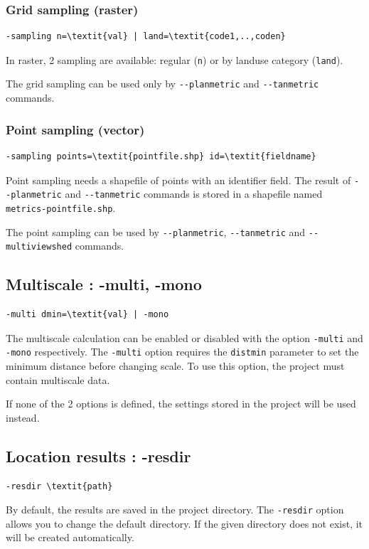 \documentclass{report}
\begin{document}
\subsubsection{Grid sampling (raster)}
\begin{Verbatim}[commandchars=\\\{\}]
-sampling n=\textit{val} | land=\textit{code1,..,coden}
\end{Verbatim}
In raster, 2 sampling are available: regular (\verb|n|) or by landuse category (\verb|land|).

The grid sampling can be used only by \verb|--planmetric| and \verb|--tanmetric| commands.

\subsubsection{Point sampling (vector)}
\begin{Verbatim}[commandchars=\\\{\}]
-sampling points=\textit{pointfile.shp} id=\textit{fieldname}
\end{Verbatim}
Point sampling needs a shapefile of points with an identifier field.
The result of \verb|--planmetric| and \verb|--tanmetric| commands is stored in a shapefile named \verb|metrics-pointfile.shp|.

The point sampling can be used by \verb|--planmetric|, \verb|--tanmetric| and \verb|--multiviewshed| commands.

\subsection{Multiscale : -multi, -mono}
\begin{Verbatim}[commandchars=\\\{\}]
-multi dmin=\textit{val} | -mono
\end{Verbatim}

The multiscale calculation can be enabled or disabled with the option \verb|-multi| and \verb|-mono| respectively.
The \verb|-multi| option requires the \verb|distmin| parameter to set the minimum distance before changing scale. To use this option, the project must contain multiscale data.

If none of the 2 options is defined, the settings stored in the project will be used instead.

\subsection{Location results : -resdir}
\begin{Verbatim}[commandchars=\\\{\}]
-resdir \textit{path}
\end{Verbatim}
By default, the results are saved in the project directory. The \verb|-resdir| option allows you to change the default directory.
If the given directory does not exist, it will be created automatically.
\end{document}
